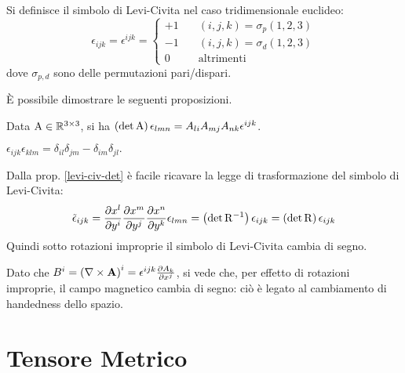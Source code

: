 \begin{definition}\label{def-lc}
	Si definisce il simbolo di Levi-Civita nel caso tridimensionale euclideo:
	\begin{equation}
		\epsilon_{ijk} = \epsilon^{ijk} = 
		\begin{cases}
			+1 &\quad (i,j,k) = \sigma_p(1,2,3) \\
			-1 &\quad (i,j,k) = \sigma_d(1,2,3) \\
			0  &\quad \text{altrimenti}
		\end{cases}
		\label{eq:10}
	\end{equation}
	dove $ \sigma_{p,d} $ sono delle permutazioni pari/dispari.
\end{definition}

È possibile dimostrare le seguenti proposizioni.

\begin{proposition}\label{levi-civ-det}
	Data $ \mathrm{A} \in \mathbb{R}^{3\times 3} $, si ha $ \left(\det\mathrm{A}\right) \epsilon_{lmn} = A_{li} A_{mj} A_{nk} \epsilon^{ijk} $.
\end{proposition}

\begin{proposition}\label{epsilon-delta}
	$ \epsilon_{ijk}\epsilon_{klm} = \delta_{il}\delta_{jm} - \delta_{im}\delta_{jl}.$
\end{proposition}

Dalla prop. \ref{levi-civ-det} è facile ricavare la legge di trasformazione del simbolo di Levi-Civita:
\begin{equation}
	\tilde{\epsilon}_{ijk} = \frac{\partial x^l}{\partial y^i} \frac{\partial x^m}{\partial y^j} \frac{\partial x^n}{\partial y^k} \epsilon_{lmn} = \left(\det\mathrm{R}^{-1}\right) \epsilon_{ijk} = \left(\det\mathrm{R}\right) \epsilon_{ijk}
	\label{eq:11}
\end{equation}
Quindi sotto rotazioni improprie il simbolo di Levi-Civita cambia di segno.

\begin{example}
	Dato che $ B^i = \left(\nabla\times\mathbf{A}\right)^i = \epsilon^{ijk}\frac{\partial A_k}{\partial x^j}$, si vede che, per effetto di rotazioni improprie, il campo magnetico cambia di segno: ciò è legato al cambiamento di handedness dello spazio.
\end{example}


\section{Tensore Metrico}



